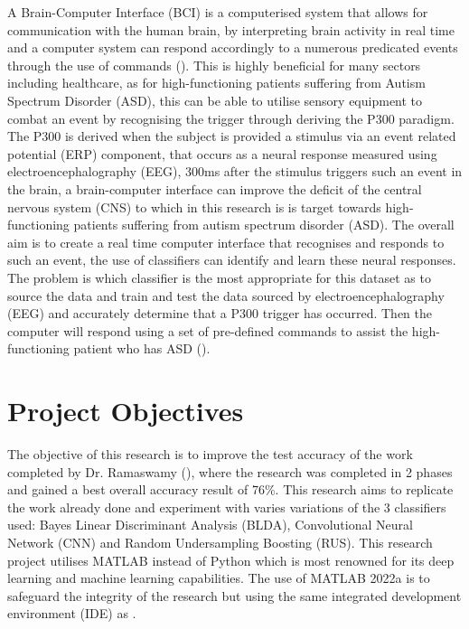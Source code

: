 A Brain-Computer Interface (BCI) is a computerised system that allows for communication with the human brain, by interpreting brain activity in real time and a computer system can respond accordingly to a numerous predicated events through the use of commands (\cite{DatasetPaper}). This is highly beneficial for many sectors including healthcare, as for high-functioning patients suffering from Autism Spectrum Disorder (ASD), this can be able to utilise sensory equipment to combat an event by recognising the trigger through deriving the P300 paradigm. The P300 is derived when the subject is provided a stimulus via an event related potential (ERP) component, that occurs as a neural response measured using electroencephalography (EEG), 300ms after the stimulus triggers such an event in the brain, a brain-computer interface can improve the deficit of the central nervous system (CNS) to which in this research is is target towards high-functioning patients suffering from autism spectrum disorder (ASD). The overall aim is to create a real time computer interface that recognises and responds to such an event, the use of classifiers can identify and learn these neural responses. \\

The problem is which classifier is the most appropriate for this dataset as to source the data and train and test the data sourced by electroencephalography (EEG) and accurately determine that a P300 trigger has occurred. Then the computer will respond using a set of pre-defined commands to assist the high-functioning patient who has ASD (\cite{ClinicalTrialPaper}).

\section{Project Objectives}
\label{Project Objectives Section}

The objective of this research is to improve the test accuracy of the work completed by Dr. Ramaswamy (\cite{PalaniPaper}), where the research was completed in 2 phases and gained a best overall accuracy result of 76\%. This research aims to replicate the work already done and experiment with varies variations of the 3 classifiers used: Bayes Linear Discriminant Analysis (BLDA), Convolutional Neural Network (CNN) and Random Undersampling Boosting (RUS). This research project utilises MATLAB instead of Python which is most renowned for its deep learning and machine learning capabilities. The use of MATLAB 2022a is to safeguard the integrity of the research but using the same integrated development environment (IDE) as \cite{PalaniPaper}. \\

